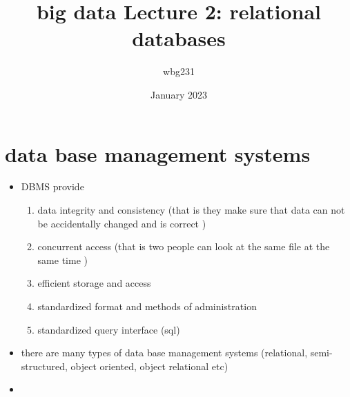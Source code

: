 \documentclass{article}
\title{big data Lecture 2: relational databases}
\author{wbg231 }
\date{January 2023}
\begin{document}
\maketitle

\section{data base management systems}
\begin{itemize}
    
\item DBMS provide
\begin{enumerate}
    \item data integrity and consistency (that is they make sure that data can not be accidentally changed and is correct )
    \item concurrent access (that is two people can look at the same file at the same time )
    \item efficient storage and access 
    \item standardized format and methods of administration 
    \item standardized query interface (sql)
\end{enumerate}
\item there are many types of data base management systems (relational, semi-structured, object oriented, object relational etc)
\item 
\end{itemize}
\end{document}
